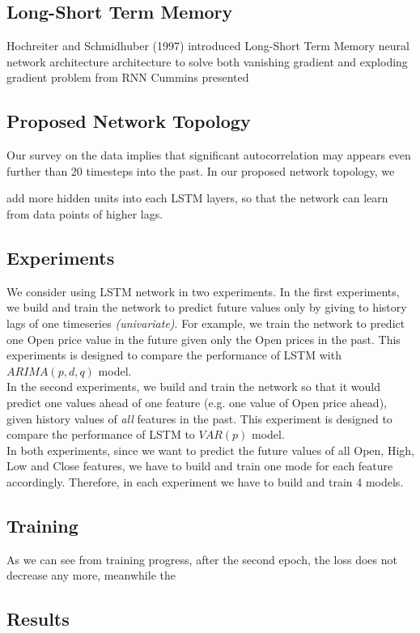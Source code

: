 \documentclass[11pt]{article}
\begin{document}
\subsection{Long-Short Term Memory}
Hochreiter and Schmidhuber (1997) \cite{gers1999learning} introduced Long-Short
Term Memory neural network architecture architecture to solve both vanishing
gradient and exploding gradient problem from RNN Cummins presented

\subsection{Proposed Network Topology}
Our survey on the data implies that significant autocorrelation may appears even
further than 20 timesteps into the past. In our proposed network topology, we

add more hidden units into each LSTM layers, so that the network can learn from
data points of higher lags.

\subsection{Experiments}
We consider using LSTM network in two experiments. In the first experiments, we
build and train the network to predict future values only by giving to history
lags of one timeseries \textit{(univariate)}. For example, we train the network to
predict one Open price value in the future given only the Open prices in the
past. This experiments is designed to compare the performance of LSTM with
$ARIMA(p, d, q)$ model.\\ 
In the second experiments, we build and train the network so that it would
predict one values ahead of one feature (e.g. one value of Open price ahead),
given history values of \textit{all} features in the past. This experiment is
designed to compare the performance of LSTM to $VAR(p)$ model.\\
In both experiments, since we want to predict the future values of all Open,
High, Low and Close features, we have to build and train one mode for each
feature accordingly. Therefore, in each experiment we have to build and train 4
models.

\subsection{Training}
As we can see from training progress, after the second epoch, the loss does not decrease any more, meanwhile the
\subsection{Results}
\end{document}
